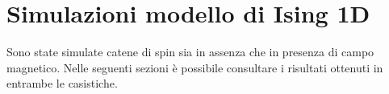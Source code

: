 \section{Simulazioni modello di Ising 1D}

Sono state simulate catene di spin sia in assenza che in presenza di campo magnetico. Nelle seguenti sezioni è possibile consultare 
i risultati ottenuti in entrambe le casistiche.

\newpage
